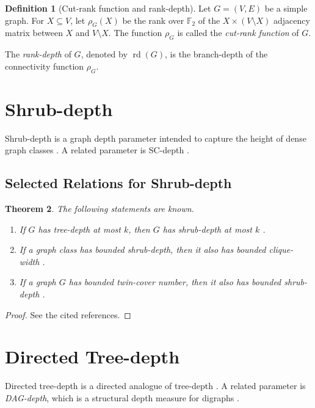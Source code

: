 \documentclass[10pt]{book}
\newtheorem{theorem}{Theorem}[section]
\theoremstyle{definition}
\newtheorem{definition}[theorem]{Definition}
\begin{document}
\begin{definition}[Cut-rank function and rank-depth]
\cite{91}
Let \(G=(V,E)\) be a simple graph.  
For \(X\subseteq V\), let \(\rho_G(X)\) be the rank over \(\mathbb{F}_2\) of the \(X\times (V\setminus X)\) adjacency matrix between \(X\) and \(V\setminus X\).  
The function \(\rho_G\) is called the \emph{cut-rank function} of \(G\).

The \emph{rank-depth} of \(G\), denoted by \(\operatorname{rd}(G)\), is the branch-depth of the connectivity function \(\rho_G\).
\end{definition}

\section{Shrub-depth}

Shrub-depth is a graph depth parameter intended to capture the height of dense graph classes \cite{168,170}.  
A related parameter is SC-depth \cite{168,170}.

\subsection{Selected Relations for Shrub-depth}

\begin{theorem}
The following statements are known.
\begin{enumerate}
    \item If \(G\) has tree-depth at most \(k\), then \(G\) has shrub-depth at most \(k\) \cite{350}.

    \item If a graph class has bounded shrub-depth, then it also has bounded clique-width \cite{350}.

    \item If a graph \(G\) has bounded twin-cover number, then it also has bounded shrub-depth \cite{343}.
\end{enumerate}
\end{theorem}

\begin{proof}
See the cited references.
\end{proof}

\section{Directed Tree-depth}

Directed tree-depth is a directed analogue of tree-depth \cite{169}.  
A related parameter is \emph{DAG-depth}, which is a structural depth measure for digraphs \cite{388,Ganian2014DigraphWM}.
\end{document}
